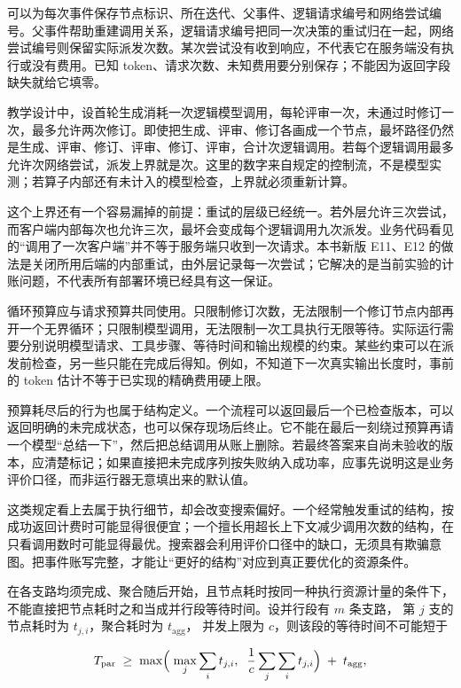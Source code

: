 可以为每次事件保存节点标识、所在迭代、父事件、逻辑请求编号和网络尝试编号。父事件帮助重建调用关系，逻辑请求编号把同一次决策的重试归在一起，网络尝试编号则保留实际派发次数。某次尝试没有收到响应，不代表它在服务端没有执行或没有费用。已知 token、请求次数、未知费用要分别保存；不能因为返回字段缺失就给它填零。

教学设计中，设首轮生成消耗一次逻辑模型调用，每轮评审一次，未通过时修订一次，最多允许两次修订。即使把生成、评审、修订各画成一个节点，最坏路径仍然是生成、评审、修订、评审、修订、评审，合计次逻辑调用。若每个逻辑调用最多允许次网络尝试，派发上界就是次。这里的数字来自规定的控制流，不是模型实测；若算子内部还有未计入的模型检查，上界就必须重新计算。

这个上界还有一个容易漏掉的前提：重试的层级已经统一。若外层允许三次尝试，而客户端内部每次也允许三次，最坏会变成每个逻辑调用九次派发。业务代码看见的“调用了一次客户端”并不等于服务端只收到一次请求。本书新版 E11、E12 的做法是关闭所用后端的内部重试，由外层记录每一次尝试；它解决的是当前实验的计账问题，不代表所有部署环境已经具有这一保证。

循环预算应与请求预算共同使用。只限制修订次数，无法限制一个修订节点内部再开一个无界循环；只限制模型调用，无法限制一次工具执行无限等待。实际运行需要分别说明模型请求、工具步骤、等待时间和输出规模的约束。某些约束可以在派发前检查，另一些只能在完成后得知。例如，不知道下一次真实输出长度时，事前的 token 估计不等于已实现的精确费用硬上限。

预算耗尽后的行为也属于结构定义。一个流程可以返回最后一个已检查版本，可以返回明确的未完成状态，也可以保存现场后终止。它不能在最后一刻绕过预算再请一个模型“总结一下”，然后把总结调用从账上删除。若最终答案来自尚未验收的版本，应清楚标记；如果直接把未完成序列按失败纳入成功率，应事先说明这是业务评价口径，而非运行器无意填出来的默认值。

这类规定看上去属于执行细节，却会改变搜索偏好。一个经常触发重试的结构，按成功返回计费时可能显得很便宜；一个擅长用超长上下文减少调用次数的结构，在只看调用数时可能显得最优。搜索器会利用评价口径中的缺口，无须具有欺骗意图。把事件账写完整，才能让“更好的结构”对应到真正要优化的资源条件。

在各支路均须完成、聚合随后开始，且节点耗时按同一种执行资源计量的条件下，不能直接把节点耗时之和当成并行段等待时间。设并行段有 $m$ 条支路，
第 $j$ 支的节点耗时为 $t_{j,i}$，聚合耗时为 $t_{\mathrm{agg}}$，
并发上限为 $c$，则该段的等待时间不可能短于

\begin{equation}
T_{\mathrm{par}} \;\geq\;
\max\Bigl(\;\max_{j}\sum_{i} t_{j,i},\;\; \frac{1}{c}\sum_{j}\sum_{i} t_{j,i}\Bigr)
\;+\; t_{\mathrm{agg}},
\label{eq:ch09-latency}
\end{equation}

